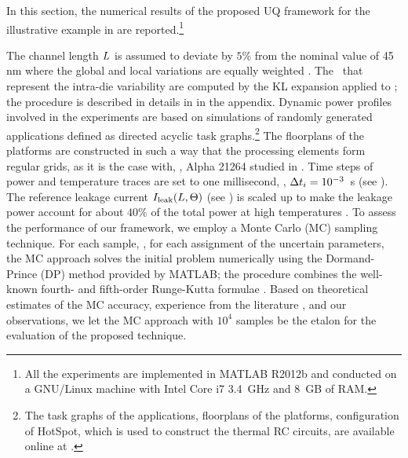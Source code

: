 In this section, the numerical results of the proposed UQ framework for the illustrative example in  are reported.\footnote{All the experiments are implemented in MATLAB R2012b \cite{matlab} and conducted on a GNU/Linux machine with Intel Core i7 3.4~GHz and 8~GB of RAM.}

The channel length $L$ is assumed to deviate by $5\%$ from the nominal value of 45 nm where the global and local variations are equally weighted \cite{juan2011, juan2012}. The \rvs\ that represent the intra-die variability are computed by the KL expansion applied to ; the procedure is described in details in  in the appendix. Dynamic power profiles involved in the experiments are based on simulations of randomly generated applications defined as directed acyclic task graphs.\footnote{The task graphs of the applications, floorplans of the platforms, configuration of HotSpot, which is used to construct the thermal RC circuits, are available online at \cite{sources}.} The floorplans of the platforms are constructed in such a way that the processing elements form regular grids, as it is the case with, \eg, Alpha 21264 studied in \cite{juan2011}. Time steps of power and temperature traces are set to one millisecond, \ie, $\Delta t_i = 10^{-3}$~s (see ). The reference leakage current $I_{\text{leak}}(L, \Theta)$ (see ) is scaled up to make the leakage power account for about $40\%$ of the total power at high temperatures \cite{liu2007}. To assess the performance of our framework, we employ a Monte Carlo (MC) sampling technique. For each sample, \ie, for each assignment of the uncertain parameters, the MC approach solves the initial problem numerically using the Dormand-Prince (DP) method provided by MATLAB; the procedure combines the well-known fourth- and fifth-order Runge-Kutta formulae \cite{press2007}. Based on theoretical estimates \cite{diaz-emparanza2002} of the MC accuracy, experience from the literature \cite{xiu2010, eldred2009, maitre2010, shen2009}, and our observations, we let the MC approach with $10^4$ samples be the etalon for the evaluation of the proposed technique.

